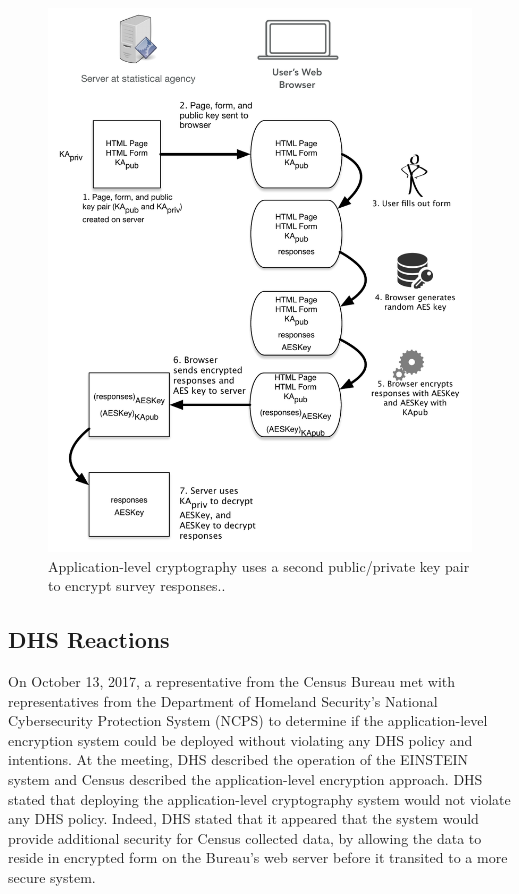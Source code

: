 \documentclass[fleqn,10pt]{wlscirep}
\begin{document}
\begin{figure}
  \includegraphics[width=\linewidth]{art/app-level-diagram}
  \caption{Application-level cryptography uses a second public/private
    key pair to encrypt survey responses..\label{app-level-diagram}}
\end{figure}

\subsection{DHS Reactions}

On October 13, 2017, a representative from the Census Bureau met with representatives from the
Department of Homeland Security's National Cybersecurity Protection
System (NCPS) to determine if the application-level encryption system
could be deployed without violating any DHS policy and intentions. At
the meeting, DHS described the operation of the EINSTEIN system and
Census described the application-level encryption approach. DHS stated
that deploying the application-level cryptography system would not violate any
DHS policy. Indeed, DHS stated that it appeared that the system would
provide additional security for Census collected data, by allowing the
data to reside in encrypted form on the Bureau's web server before it
transited to a more secure system.
\end{document}
